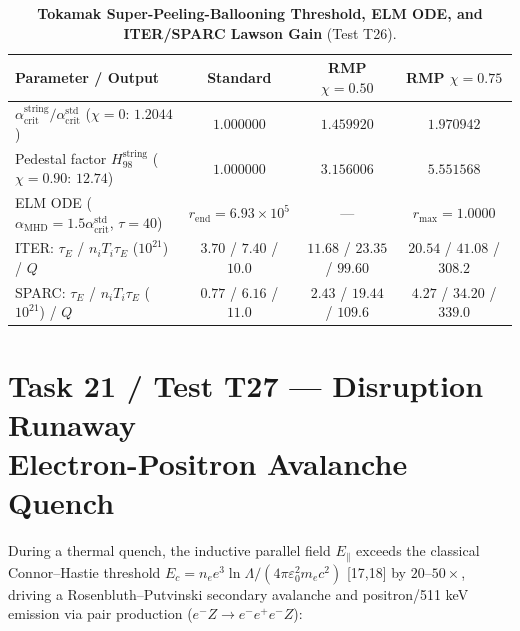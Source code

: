 \documentclass[12pt,a4paper]{article}
\begin{document}
\begin{table}[!htbp]
\centering
\footnotesize
\setlength{\tabcolsep}{2pt}
\caption{\textbf{Tokamak Super-Peeling-Ballooning Threshold, ELM ODE, and ITER/SPARC Lawson Gain} (Test T26).}
\label{tab:t26}
\vspace{0.1cm}
\begin{tabular}{@{}l|c|c|c@{}}
\hline
\textbf{Parameter / Output} & \textbf{Standard} & \textbf{RMP $\chi=0.50$} & \textbf{RMP $\chi=0.75$} \\
\hline
$\alpha_{\mathrm{crit}}^{\mathrm{string}}/\alpha_{\mathrm{crit}}^{\mathrm{std}}$ ($\chi=0$: $1.2044$) & $1.000000$ & $1.459920$ & $1.970942$ \\
Pedestal factor $H_{98}^{\mathrm{string}}$ ($\chi=0.90$: $12.74$) & $1.000000$ & $3.156006$ & $5.551568$ \\
ELM ODE ($\alpha_{\mathrm{MHD}}=1.5\alpha_{\mathrm{crit}}^{\mathrm{std}}$, $\tau=40$) & $r_{\mathrm{end}}=6.93\times 10^5$ & --- & $r_{\max}=1.0000$ \\
ITER: $\tau_E$ / $n_i T_i \tau_E$ ($10^{21}$) / $Q$ & $3.70$ / $7.40$ / $10.0$ & $11.68$ / $23.35$ / $99.60$ & $20.54$ / $41.08$ / $308.2$ \\
SPARC: $\tau_E$ / $n_i T_i \tau_E$ ($10^{21}$) / $Q$ & $0.77$ / $6.16$ / $11.0$ & $2.43$ / $19.44$ / $109.6$ & $4.27$ / $34.20$ / $339.0$ \\
\hline
\end{tabular}
\end{table}

\section[Task 21 / Test T27 --- Disruption Runaway Quench]{Task 21 / Test T27 --- Disruption Runaway \\ Electron-Positron Avalanche Quench}

During a thermal quench, the inductive parallel field $E_\parallel$ exceeds the classical Connor--Hastie threshold $E_c = n_e e^3\ln\Lambda/(4\pi\varepsilon_0^2 m_e c^2)$ [17,18] by $20$--$50\times$, driving a Rosenbluth--Putvinski secondary avalanche and positron/511 keV emission via pair production ($e^- Z \to e^- e^+ e^- Z$):
\end{document}
